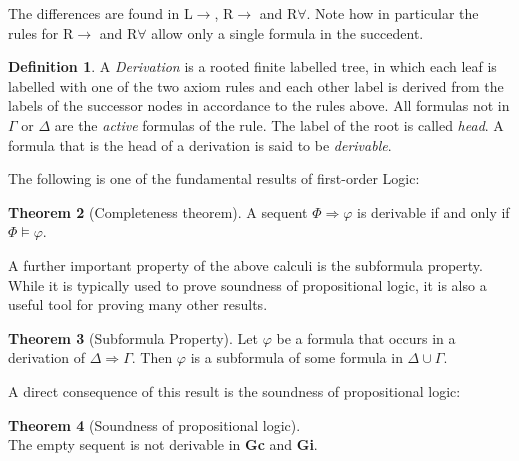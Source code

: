 \documentclass[a4paper,11pt]{report}
\theoremstyle{definition}
\newtheorem{theorem}{Theorem}[section]
\theoremstyle{definition}
\theoremstyle{definition}
\theoremstyle{definition}
\theoremstyle{definition}
\newtheorem{definition}[theorem]{Definition}
\theoremstyle{definition}
\theoremstyle{definition}
\begin{document}
	The differences are found in L$\to$, R$\to$ and R$\forall$. Note how in particular the rules for R$\to$ and R$\forall$ allow only a single formula in the succedent.
	
	\begin{definition}
		A \textit{Derivation} is a rooted finite labelled tree, in which each leaf is labelled with one of the two axiom rules and each other label is derived from the labels of the successor nodes in accordance to the rules above. All formulas not in $\Gamma$ or $\Delta$ are the \textit{active} formulas of the rule. The label of the root is called \textit{head}. A formula that is the head of a derivation is said to be \textit{derivable}.
	\end{definition}
	
	The following is one of the fundamental results of first-order Logic:
	
	\begin{theorem}[Completeness theorem]
		A sequent $\Phi\Rightarrow \varphi$ is derivable if and only if $\Phi\models \varphi$.
	\end{theorem}
	
	A further important property of the above calculi is the subformula property. While it is typically used to prove soundness of propositional logic, it is also a useful tool for proving many other results.
	
	\begin{theorem}[Subformula Property]
		Let $\varphi$ be a formula that occurs in a derivation of $\Delta\Rightarrow\Gamma$. Then $\varphi$ is a subformula of some formula in $\Delta\cup\Gamma$.
	\end{theorem}

	A direct consequence of this result is the soundness of propositional logic:
	
	\begin{theorem}[Soundness of propositional logic]\hfill\\
		The empty sequent is not derivable in \textbf{Gc} and \textbf{Gi}.
	\end{theorem}
	
\end{document}

